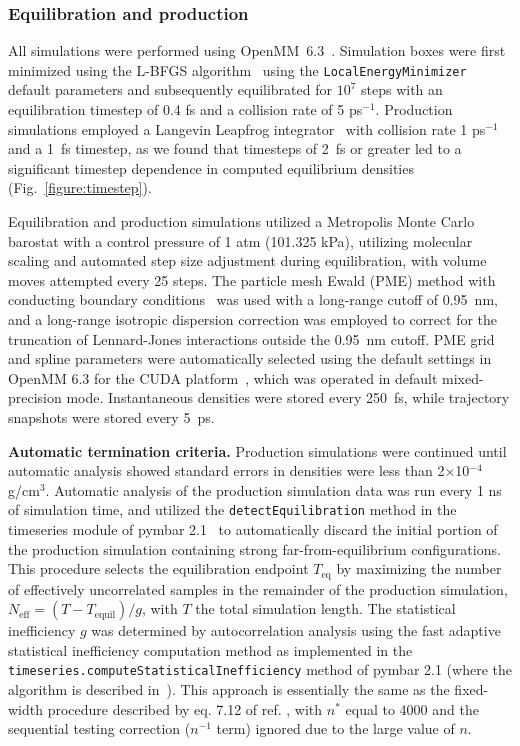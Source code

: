 \documentclass[journal=jacsat,manuscript=article]{achemso}
\begin{document}
\subsubsection{Equilibration and production}
\label{section:production}

All simulations were performed using OpenMM~6.3~\cite{eastman2012openmm}.
Simulation boxes were first minimized using the L-BFGS algorithm~\cite{liu1989limited} using the {\tt LocalEnergyMinimizer} default parameters and subsequently equilibrated for $10^7$ steps with an equilibration timestep of 0.4 fs and a collision rate of 5 ps$^{-1}$.  
Production simulations employed a Langevin Leapfrog integrator~\cite{izaguirre-sweet-pande:psb:2010:langevin-leapfrog} with collision rate 1 ps$^{-1}$ and a 1~fs timestep, as we found that timesteps of 2~fs or greater led to a significant timestep dependence in computed equilibrium densities (Fig.~\ref{figure:timestep}).  

Equilibration and production simulations utilized a Metropolis Monte Carlo barostat with a control pressure of 1 atm (101.325 kPa), utilizing molecular scaling and automated step size adjustment during equilibration, with volume moves attempted every 25 steps.  
The particle mesh Ewald (PME) method with conducting boundary conditions~\cite{Darden1993} was used with a long-range cutoff of 0.95~nm, and a long-range isotropic dispersion correction was employed to correct for the truncation of Lennard-Jones interactions outside the 0.95~nm cutoff.
PME grid and spline parameters were automatically selected using the default settings in OpenMM 6.3 for the CUDA platform~\cite{eastman2012openmm}, which was operated in default mixed-precision mode.
Instantaneous densities were stored every 250~fs, while trajectory snapshots were stored every 5~ps.  

{\bf Automatic termination criteria.}
Production simulations were continued until automatic analysis showed standard errors in densities were less than 2$\times$10$^{-4}$ g/cm$^{3}$.
Automatic analysis of the production simulation data was run every 1 ns of simulation time, and utilized the {\tt detectEquilibration} method \cite{equilibrationdetection} in the timeseries module of pymbar 2.1~\cite{shirts2008statistically} to automatically discard the initial portion of the production simulation containing strong far-from-equilibrium configurations.
This procedure selects the equilibration endpoint $T_\mathrm{eq}$ by maximizing the number of effectively uncorrelated samples in the remainder of the production simulation, $N_\mathrm{eff} = (T - T_\mathrm{equil}) / g$, with $T$ the total simulation length.
The statistical inefficiency $g$ was determined by autocorrelation analysis using the fast adaptive statistical inefficiency computation method as implemented in the {\tt timeseries.computeStatisticalInefficiency} method of pymbar 2.1 (where the algorithm is described in~\cite{chodera2007}).
This approach is essentially the same as the fixed-width procedure described by eq. 7.12 of ref. \cite{brooks2011handbook}, with $n^*$ equal to 4000 and the sequential testing correction ($n^{-1}$ term) ignored due to the large value of $n$.
\end{document}
